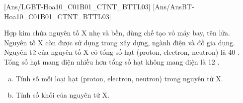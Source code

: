 [Ans/LGBT-Hoa10_C01B01_CTNT_BTTL03]
[Ans/AnsBT-Hoa10_C01B01_CTNT_BTTL03]
\begin{bt}%
	Hợp kim chứa nguyên tố $\mathrm{X}$ nhẹ và bền, dùng chế tạo vỏ máy bay, tên lửa. Nguyên tố $\mathrm{X}$ còn được sử dụng trong xây dựng, ngành điện và đồ gia dụng. Nguyên tử của nguyên tố $\mathrm{X}$ có tổng số hạt (proton, electron, neutron) là 40 . Tổng số hạt mang điện nhiều hơn tổng số hạt không mang điện là 12 .
	\begin{enumerate}[a)]
		\item Tính số mỗi loại hạt (proton, electron, neutron) trong nguyên tử $\mathrm{X}$.
		\item Tính số khối của nguyên tử $\mathrm{X}$.
	\end{enumerate}
\end{bt}
